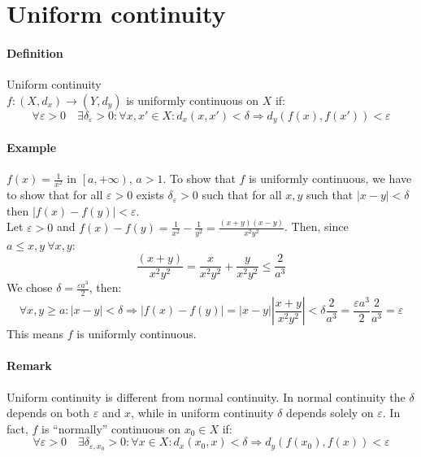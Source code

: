 \documentclass{article}
\newcommand{\abs}[1]{\left|#1\right|}
\newcommand{\func}[3]{#1 : #2 \rightarrow #3}
\newcommand{\Ep}{\varepsilon}
\newcommand{\Def}{\paragraph{Definition}}
\newcommand{\Remark}{\paragraph{Remark}}
\newcommand{\Example}{\paragraph{Example}}
\begin{document}
\section{Uniform continuity}

	\Def Uniform continuity
\\$\func{f}{(X,d_x)}{(Y,d_y)}$ is uniformly continuous on $X$ if:
\begin{equation*}
	\forall \Ep > 0 \quad \exists \delta_\Ep > 0 : \forall x,x' \in X : d_x(x,x')
	< \delta \Rightarrow d_y(f(x),f(x')) < \Ep
\end{equation*}

	\Example $f(x) = \frac{1}{x^2}$ in $\left[a, +\infty\right)$, $a > 1$. To show
	that $f$ is uniformly continuous, we have to show that for all $\Ep > 0$
	exists $\delta_\Ep > 0$ such that for all $x,y$ such that $\abs{x-y} < \delta$
	then $\abs{f(x)-f(y)} < \Ep$.
\\Let $\Ep > 0$ and $f(x) - f(y) = \frac{1}{x^2} - \frac{1}{y^2} =
	\frac{(x+y)(x-y)}{x^2 y^2}$. Then, since $a \leq x,y \ \forall x,y$:
\begin{equation*}
	\frac{(x+y)}{x^2 y^2} = \frac{x}{x^2 y^2} + \frac{y}{x^2 y^2} \leq \frac{2}{a^3}
\end{equation*}
	We chose $\delta = \frac{\Ep a^3}{2}$, then:
\begin{equation*}
	\forall x,y \geq a : \abs{x-y} < \delta \Rightarrow \abs{f(x)-f(y)} =
	\abs{x-y} \abs{\frac{x+y}{x^2 y^2}} < \delta \frac{2}{a^3} =
	\frac{\Ep a^3}{2} \frac{2}{a^3} = \Ep
\end{equation*}
	This means $f$ is uniformly continuous.

	\Remark Uniform continuity is different from normal continuity. In normal
	continuity the $\delta$ depends on both $\Ep$ and $x$, while in uniform
	continuity $\delta$ depends solely on $\Ep$. In fact, $f$ is ``normally''
	continuous on $x_0 \in X$ if:
\begin{equation*}
	\forall \Ep > 0 \quad \exists \delta_{\Ep,x_0} > 0 : \forall x \in X :
	d_x(x_0,x) < \delta \Rightarrow d_y(f(x_0),f(x)) < \Ep
\end{equation*}
\end{document}
